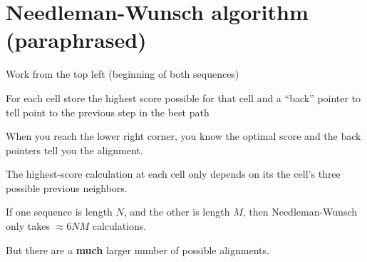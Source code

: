 \documentclass[landscape]{foils}
\begin{document}
\section*{Needleman-Wunsch algorithm (paraphrased)}
{\large
\begin{compactitem}
	\item Work from the top left (beginning of both sequences)
	\item For each cell store the highest score possible for that cell and a ``back'' pointer to tell point to the previous step in the best path 	\item When you reach the lower right corner, you know the optimal score and the back pointers tell you the alignment.
\end{compactitem}

The highest-score calculation at each cell only depends on its the cell's three possible previous neighbors.

If one sequence is length $N$, and the other is length $M$, then Needleman-Wunsch only takes $\approx 6 NM$ calculations.

But there are a {\bf much} larger number of possible alignments.
}
\myNewSlide
\end{document}
